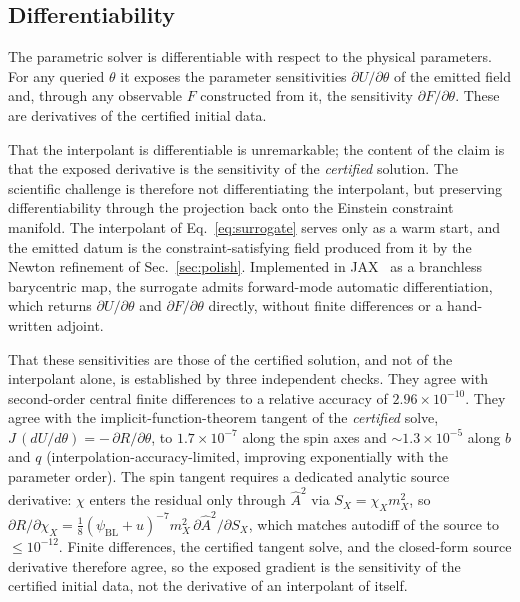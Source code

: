 \documentclass[
  aps,
  prd,
  twocolumn,
  amsmath,
  amssymb,
  nofootinbib,
  superscriptaddress,
  floatfix,
]{revtex4-2}
\newcommand{\psiBL}{\psi_{\mathrm{BL}}}
\newcommand{\Ahat}{\hat{A}}
\begin{document}
\subsection{Differentiability}
\label{sec:param:diff}

The parametric solver is differentiable with respect to the physical parameters.
For any queried $\theta$ it exposes the parameter sensitivities
$\partial U/\partial\theta$ of the emitted field and, through any observable $F$
constructed from it, the sensitivity $\partial F/\partial\theta$. These are
derivatives of the certified initial data.

That the interpolant is differentiable is unremarkable; the content of the claim is
that the exposed derivative is the sensitivity of the \emph{certified} solution.
The scientific challenge is therefore not differentiating the interpolant, but preserving differentiability through the projection back onto the Einstein constraint manifold.
The interpolant of Eq.~\eqref{eq:surrogate} serves only as a warm start, and the emitted
datum is the constraint-satisfying field produced from it by the Newton refinement of
Sec.~\ref{sec:polish}. Implemented in JAX~\cite{Jax2018} as a branchless barycentric
map, the surrogate admits forward-mode automatic differentiation, which returns
$\partial U/\partial\theta$ and $\partial F/\partial\theta$ directly, without finite
differences or a hand-written adjoint.

{\color{red}
That these sensitivities are those of the certified solution, and not of the
interpolant alone, is established by three independent checks. They agree with
second-order central finite differences to a relative accuracy of
$2.96\times10^{-10}$. They agree with the implicit-function-theorem tangent of the
\emph{certified} solve, $J\,(dU/d\theta) = -\,\partial R/\partial\theta$, to
$1.7\times10^{-7}$ along the spin axes and $\sim1.3\times10^{-5}$ along $b$ and $q$
(interpolation-accuracy-limited, improving exponentially with the parameter order).
The spin tangent requires a dedicated analytic source derivative: $\chi$ enters the
residual only through $\Ahat^2$ via $S_X = \chi_X m_X^2$, so
$\partial R/\partial\chi_X = \tfrac{1}{8}(\psiBL+u)^{-7} m_X^2\,\partial \Ahat^2/\partial S_X$,
which matches autodiff of the source to $\le 10^{-12}$. Finite differences, the
certified tangent solve, and the closed-form source derivative therefore agree, so
the exposed gradient is the sensitivity of the certified initial data, not the
derivative of an interpolant of itself.}
\end{document}

